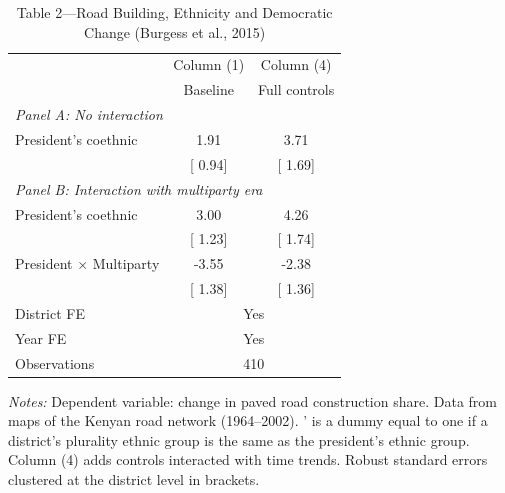 \begin{table}[htbp]
\centering
\caption{Table 2---Road Building, Ethnicity and Democratic Change (Burgess et al., 2015)}
\label{tab:burgess_table2}
\begin{tabular}{lcc}
\toprule
 & Column (1) & Column (4) \\
 & Baseline & Full controls \\
\midrule
\multicolumn{3}{l}{\textit{Panel A: No interaction}} \\[3pt]
President's coethnic &     1.91 &     3.71 \\
 & [    0.94] & [    1.69] \\[6pt]
\multicolumn{3}{l}{\textit{Panel B: Interaction with multiparty era}} \\[3pt]
President's coethnic &     3.00 &     4.26 \\
 & [    1.23] & [    1.74] \\
President $\times$ Multiparty &    -3.55 &    -2.38 \\
 & [    1.38] & [    1.36] \\[6pt]
\midrule
District FE & \multicolumn{2}{c}{Yes} \\
Year FE & \multicolumn{2}{c}{Yes} \\
Observations & \multicolumn{2}{c}{     410} \\
\bottomrule
\end{tabular}

\vspace{6pt}
\begin{minipage}{0.85\textwidth}
\footnotesize
\textit{Notes:} Dependent variable: change in paved road construction share. 
Data from maps of the Kenyan road network (1964--2002). 
' is a dummy equal to one if a district's 
plurality ethnic group is the same as the president's ethnic group. 
Column (4) adds controls interacted with time trends. 
Robust standard errors clustered at the district level in brackets.
\end{minipage}
\end{table}
